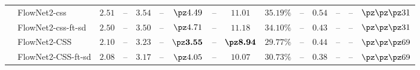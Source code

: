 {\begin{tabular}{|c|l||cc|cc||cc|ccc||cc||cc|}
        &
        FlowNet2-css 
        & $2.51$ & -- %
        & $3.54$ & -- %
        & $\pz4.49$ & -- %
        & $11.01$ & $35.19\%$ & -- %
        & $0.54$ & -- %
        & -- & $\pz\pz\pz31$%
        \\%

        &
        FlowNet2-css-ft-sd
        & $2.50$ & -- %
        & $3.50$ & -- %
        & $\pz4.71$ & -- %
        & $11.18$ & $34.10\%$ & -- %
        & $0.43$ & -- %
        & -- & $\pz\pz\pz31$%
        \\%

        &
        FlowNet2-CSS 
        & $2.10$ & -- %
        & $3.23$ & -- %
        & $\pz\textbf{3.55}$ & -- %
        & $\textbf{\pz8.94}$ & $29.77\%$ & -- %
        & $0.44$ & -- %
        & -- & $\pz\pz\pz69$%
        \\%

        &
        FlowNet2-CSS-ft-sd 
        & $2.08$  & -- %
        & $3.17$  & -- %
        & $\pz4.05$ & -- %
        & $10.07$ & $30.73\%$ & -- %
        & $0.38$ & -- %
        & -- & $\pz\pz\pz69$%
        \\%



\end{tabular}}
